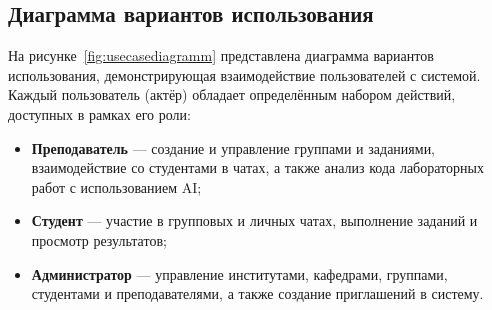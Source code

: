 \subsection{Диаграмма вариантов использования}

На рисунке~\ref{fig:usecasediagramm} представлена диаграмма вариантов использования, демонстрирующая взаимодействие пользователей с системой. Каждый пользователь (актёр) обладает определённым набором действий, доступных в рамках его роли:

\begin{itemize}
    \item \textbf{Преподаватель} — создание и управление группами и заданиями, взаимодействие со студентами в чатах, а также анализ кода лабораторных работ с использованием AI;
    \item \textbf{Студент} — участие в групповых и личных чатах, выполнение заданий и просмотр результатов;
    \item \textbf{Администратор} — управление институтами, кафедрами, группами, студентами и преподавателями, а также создание приглашений в систему.
\end{itemize}

